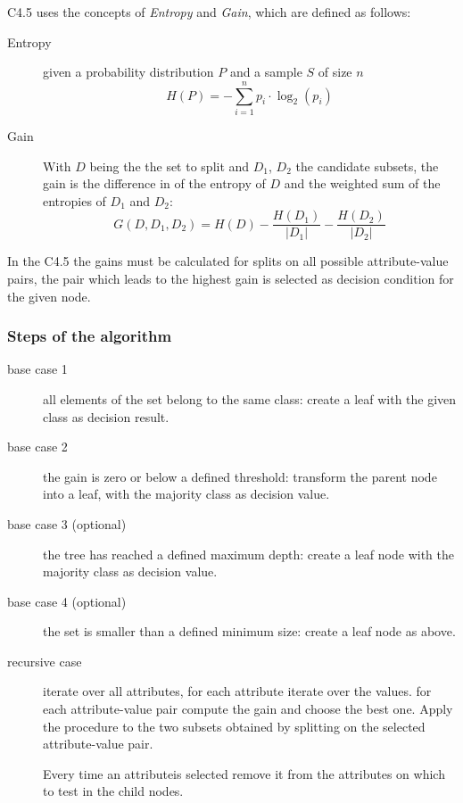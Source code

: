 \documentclass[a4paper]{usiinfbachelorproject}
\begin{document}
C4.5 uses the concepts of \emph{Entropy} and \emph{Gain},
which are defined as follows:

\begin{description}

	\item[Entropy]
	given a probability distribution $P$ and a sample $S$ of size $n$
	$$H(P) = - \sum_{i=1}^n p_i \cdot \log_2 (p_i)$$
	
	\item[Gain]
	With $D$ being the the set to split and $D_1$, $D_2$ the candidate subsets,
	the gain is the difference in of the entropy of $D$ and the weighted
	sum of the entropies of $D_1$ and $D_2$:
	$$G(D, D_1, D_2) = H(D) - \frac{H(D_1)}{|D_1|} - \frac{H(D_2)}{|D_2|}$$
	
\end{description}

In the C4.5 the gains must be calculated for splits on all possible
attribute-value pairs, the pair which leads to the highest gain is
selected as decision condition for the given node.

	\subsubsection{\textbf{Steps of the algorithm}}
	
\begin{description}

	\item[base case 1]
	all elements of the set belong to the same class: create
	a leaf with the given class as decision result.
	
	\item[base case 2]
	the gain is zero or below a defined threshold:
	transform the parent node into a leaf, with the majority class as 
	decision value.
	
	\item[base case 3 (optional)]
	the tree has reached a defined maximum depth: create a leaf node with the majority class as 
	decision value.
	
	\item[base case 4 (optional)]
	the set is smaller than a defined minimum size: create a leaf node as above.

	\item[recursive case]
iterate over all attributes, for each attribute iterate over the values. for
each attribute-value pair compute the gain and choose the best one.
Apply the procedure to the two subsets obtained by splitting on the selected attribute-value pair.

Every time an attributeis selected remove it from the attributes on which to test in the child nodes.

\end{description}
\end{document}
